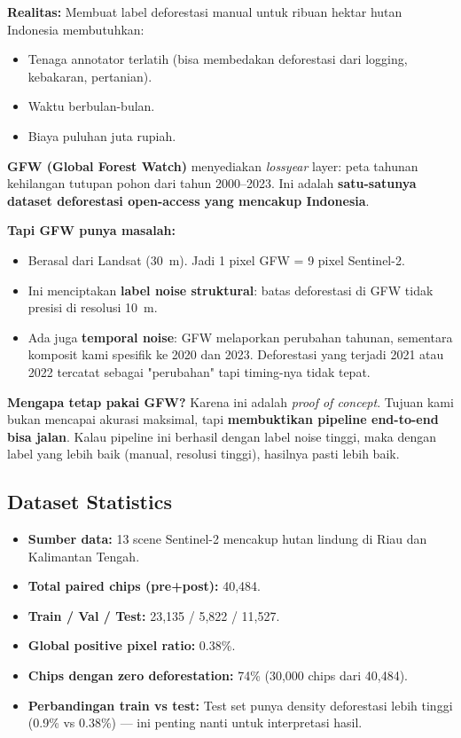 \documentclass[10pt,a4paper,onecolumn]{article}
\begin{document}
\textbf{Realitas:} Membuat label deforestasi manual untuk ribuan
hektar hutan Indonesia membutuhkan:
\begin{itemize}[nosep]
    \item Tenaga annotator terlatih (bisa membedakan deforestasi dari
          logging, kebakaran, pertanian).
    \item Waktu berbulan-bulan.
    \item Biaya puluhan juta rupiah.
\end{itemize}

\textbf{GFW (Global Forest Watch)} \cite{hansen2013high} menyediakan
\textit{lossyear} layer: peta tahunan kehilangan tutupan pohon dari
tahun 2000--2023. Ini adalah \textbf{satu-satunya dataset deforestasi
open-access yang mencakup Indonesia}.

\textbf{Tapi GFW punya masalah:}
\begin{itemize}[nosep]
    \item Berasal dari Landsat (30~m). Jadi 1 pixel GFW = 9 pixel
          Sentinel-2.
    \item Ini menciptakan \textbf{label noise struktural}: batas
          deforestasi di GFW tidak presisi di resolusi 10~m.
    \item Ada juga \textbf{temporal noise}: GFW melaporkan perubahan
          tahunan, sementara komposit kami spesifik ke 2020 dan 2023.
          Deforestasi yang terjadi 2021 atau 2022 tercatat sebagai
          "perubahan" tapi timing-nya tidak tepat.
\end{itemize}

\textbf{Mengapa tetap pakai GFW?} Karena ini adalah \textit{proof of
concept}. Tujuan kami bukan mencapai akurasi maksimal, tapi
\textbf{membuktikan pipeline end-to-end bisa jalan}. Kalau pipeline
ini berhasil dengan label noise tinggi, maka dengan label yang lebih
baik (manual, resolusi tinggi), hasilnya pasti lebih baik.

\subsection{Dataset Statistics}

\begin{itemize}[nosep]
    \item \textbf{Sumber data:} 13 scene Sentinel-2 mencakup hutan
          lindung di Riau dan Kalimantan Tengah.
    \item \textbf{Total paired chips (pre+post):} 40,484.
    \item \textbf{Train / Val / Test:} 23,135 / 5,822 / 11,527.
    \item \textbf{Global positive pixel ratio:} 0.38\%.
    \item \textbf{Chips dengan zero deforestation:} 74\% (30,000
          chips dari 40,484).
    \item \textbf{Perbandingan train vs test:} Test set punya density
          deforestasi lebih tinggi (0.9\% vs 0.38\%) — ini penting
          nanti untuk interpretasi hasil.
\end{itemize}
\end{document}
